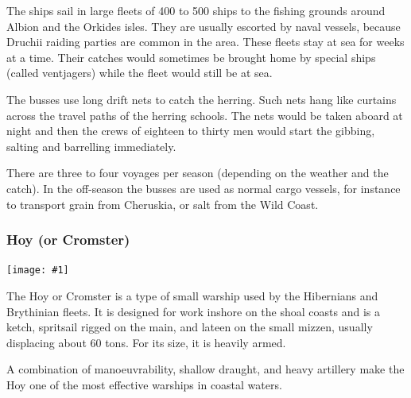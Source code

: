 \documentclass[a4paper]{dnd5}
\newcommand\inc[1]{
 \texttt{[image: \#1]}
}
\begin{document}
The ships sail in large fleets of 400 to 500 ships to the fishing grounds around Albion and the Orkides isles. They are usually escorted by naval vessels, because Druchii raiding parties are common in the area.  These fleets stay at sea for weeks at a time. Their catches would sometimes be brought home by special ships (called ventjagers) while the fleet would still be at sea.  

The busses use long drift nets to catch the herring. Such nets hang like curtains across the travel paths of the herring schools.  The nets would be taken aboard at night and then the crews of eighteen to thirty men would start the gibbing, salting and barrelling immediately.

There are three to four voyages per season (depending on the weather and the catch). In the off-season the busses are used as normal cargo vessels, for instance to transport grain from Cheruskia, or salt from the Wild Coast. 


\subsubsection*{Hoy (or Cromster)}
\inc{hoy.jpg}

The Hoy or Cromster is a type of small warship used by the Hibernians and Brythinian fleets.  It is designed for work inshore on the shoal coasts and is a ketch, spritsail rigged on the main, and lateen on the small mizzen, usually displacing about 60 tons.  For its size, it is heavily armed.

A combination of manoeuvrability, shallow draught, and heavy artillery make the Hoy one of the most effective warships in coastal waters.  
\end{document}
